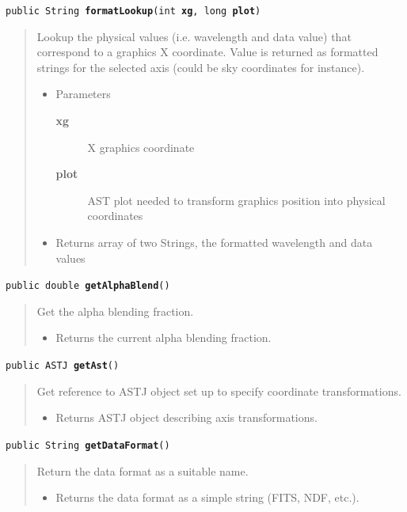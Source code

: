 \documentclass[twoside,11pt]{article}
\renewcommand{\_}{\texttt{\symbol{95}}}
\newcommand{\method}[1]{\texttt{#1}}
\newenvironment{desc}{\begin{quote}}{\end{quote}}
\begin{document}
\method{public String \textbf{formatLookup}(\texttt{int} \textbf{xg}, \texttt{long} \textbf{plot})\label{l43}\label{l44}}
\begin{desc}Lookup the physical values (i.e. wavelength and data value)
 that correspond to a graphics X coordinate. Value is returned
 as formatted strings for the selected axis (could be sky
 coordinates for instance).
\begin{itemize}
\item{Parameters
  \begin{description}
   \item[\textbf{xg}]{X graphics coordinate}
   \item[\textbf{plot}]{AST plot needed to transform graphics position
             into physical coordinates}
  \end{description}}
\end{itemize}
\begin{itemize}
\item{Returns array of two Strings, the formatted wavelength and
         data values }
\end{itemize}
\end{desc}

\method{public double \textbf{getAlphaBlend}()\label{l45}\label{l46}}
\begin{desc}Get the alpha blending fraction.
\begin{itemize}
\item{Returns the current alpha blending fraction. }
\end{itemize}
\end{desc}

\method{public ASTJ \textbf{getAst}()\label{l47}\label{l48}}
\begin{desc}Get reference to ASTJ object set up to specify coordinate
 transformations.
\begin{itemize}
\item{Returns ASTJ object describing axis transformations. }
\end{itemize}
\end{desc}

\method{public String \textbf{getDataFormat}()\label{l49}\label{l50}}
\begin{desc}Return the data format as a suitable name.
\begin{itemize}
\item{Returns the data format as a simple string (FITS, NDF, etc.). }
\end{itemize}
\end{desc}
\end{document}
